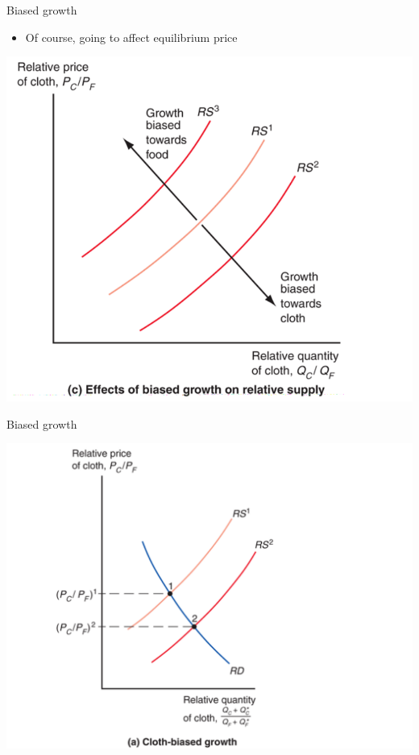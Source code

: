 \documentclass[ignorenonframetext,]{beamer}
\begin{document}
\begin{frame}{Biased growth}

    \begin{itemize}
        \item Of course, going to affect equilibrium price
    \end{itemize}
    \includegraphics[scale=0.25]{biased_growth_rs.png}

\end{frame}

\begin{frame}{Biased growth}

    \includegraphics[scale=0.25]{cloth_growth.png}

\end{frame}
\end{document}
